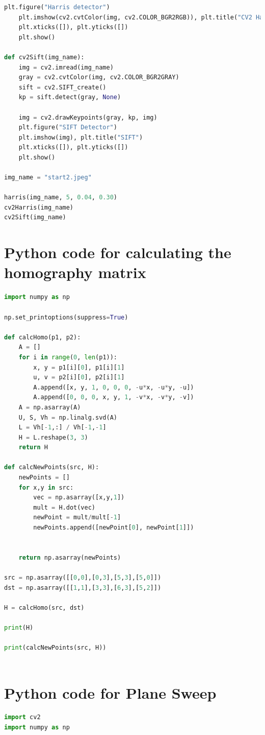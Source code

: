 \documentclass{article}
\begin{document}
\begin{appendices}
\begin{lstlisting}[language=Python]
    plt.figure("Harris detector")
    plt.imshow(cv2.cvtColor(img, cv2.COLOR_BGR2RGB)), plt.title("CV2 Harris")
    plt.xticks([]), plt.yticks([])
    plt.show()

def cv2Sift(img_name):
    img = cv2.imread(img_name)
    gray = cv2.cvtColor(img, cv2.COLOR_BGR2GRAY)
    sift = cv2.SIFT_create()
    kp = sift.detect(gray, None)

    img = cv2.drawKeypoints(gray, kp, img)
    plt.figure("SIFT Detector")
    plt.imshow(img), plt.title("SIFT")
    plt.xticks([]), plt.yticks([])
    plt.show()

img_name = "start2.jpeg"

harris(img_name, 5, 0.04, 0.30)
cv2Harris(img_name)
cv2Sift(img_name)

        \end{lstlisting}
    \section{Python code for calculating the homography matrix}
    \label{appendix:homo}
    \begin{lstlisting}[language=Python]
import numpy as np

np.set_printoptions(suppress=True)

def calcHomo(p1, p2):
    A = []
    for i in range(0, len(p1)):
        x, y = p1[i][0], p1[i][1]
        u, v = p2[i][0], p2[i][1]
        A.append([x, y, 1, 0, 0, 0, -u*x, -u*y, -u])
        A.append([0, 0, 0, x, y, 1, -v*x, -v*y, -v])
    A = np.asarray(A)
    U, S, Vh = np.linalg.svd(A)
    L = Vh[-1,:] / Vh[-1,-1]
    H = L.reshape(3, 3)
    return H

def calcNewPoints(src, H):
    newPoints = []
    for x,y in src:
        vec = np.asarray([x,y,1])
        mult = H.dot(vec)
        newPoint = mult/mult[-1]
        newPoints.append([newPoint[0], newPoint[1]])

        
    return np.asarray(newPoints)

src = np.asarray([[0,0],[0,3],[5,3],[5,0]])
dst = np.asarray([[1,1],[3,3],[6,3],[5,2]])

H = calcHomo(src, dst)

print(H)

print(calcNewPoints(src, H))
        

    \end{lstlisting}
    \section{Python code for Plane Sweep}
    \label{appendix:PS}
    \begin{lstlisting}[language=python]
import cv2
import numpy as np


\end{lstlisting}
\end{appendices}
\end{document}

